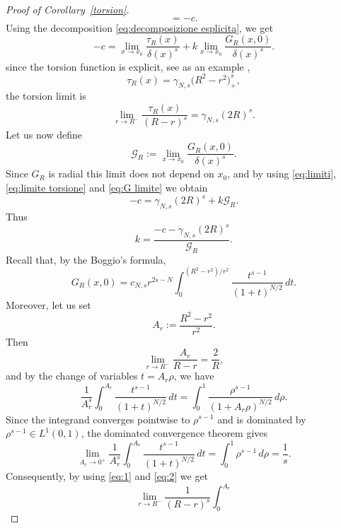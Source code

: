 \documentclass[11pt,a4paper]{article}
\newcommand{\dd}{\,d}
\begin{document}
\begin{proof}[Proof of Corollary~\ref{torsion}]
\[=
-c.
\]
Using the decomposition \eqref{eq:decomposizione esplicita}, we get
\begin{equation}\label{eq:limiti}
-c
=
\lim_{x\to x_0}
\frac{\tau_{R}(x)}{\delta(x)^s}
+
k
\lim_{x\to x_0}
\frac{G_{R}(x,0)}{\delta(x)^s}.
\end{equation}
since the torsion function is explicit, see as an example \cite{RosOtonSerra},
\begin{equation*}
\tau_{R}(x)
=
\gamma_{N,s}\bigl(R^2-r^2\bigr)_+^s,
\end{equation*}
the torsion limit is
\begin{equation}\label{eq:limite torsione}
\lim_{r\to R^-}
\frac{\tau_{R}(x)}{(R-r)^s}
=
\gamma_{N,s}(2R)^s.
\end{equation}
Let us now define
\begin{equation}\label{eq:G limite}
\mathcal G_{R}
:=
\lim_{x\to x_0}
\frac{G_{R}(x,0)}{\delta(x)^s}.
\end{equation}
Since $G_{R}$ is radial this limit does not depend on \(x_0\), and by using \eqref{eq:limiti}, \eqref{eq:limite torsione} and \eqref{eq:G limite} we obtain
\[
-c=\gamma_{N,s}(2R)^s+k\mathcal G_{R}.
\]
Thus
\begin{equation}\label{eq:k}
k=
\frac{-c-\gamma_{N,s}(2R)^s}{\mathcal G_{R}}.
\end{equation}
Recall that, by the Boggio's formula,
\begin{equation}\label{eq:Boggio's}
G_{R}(x,0)
=
c_{N,s}r^{2s-N}
\int_0^{(R^2-r^2)/r^2}
\frac{t^{s-1}}{(1+t)^{N/2}}\dd t.
\end{equation}
Moreover, let us set
\[
A_r:=\frac{R^2-r^2}{r^2}.
\]
Then
\begin{equation}\label{eq:1}
\lim_{r\to R^-}\frac{A_r}{R-r}=\frac2R,
\end{equation}
and by the change of variables \(t=A_{r}\rho\), we have
\[
\frac{1}{A_{r}^s}\int_0^{A_{r}}
\frac{t^{s-1}}{(1+t)^{N/2}}\,dt
=
\int_0^1
\frac{\rho^{s-1}}{(1+A_{r}\rho)^{N/2}}\,d\rho.
\]
Since the integrand converges pointwise to \(\rho^{s-1}\) and is dominated by
\(\rho^{s-1}\in L^1(0,1)\), the dominated convergence theorem gives
\begin{equation}\label{eq:2}
\lim_{A_{r}\to0^+}
\frac{1}{A^{s}_{r}}
\int_0^{A_{r}}
\frac{t^{s-1}}{(1+t)^{N/2}}\,dt
=
\int_0^1\rho^{s-1}\,d\rho
=
\frac1s.
\end{equation}
Consequently, by using \eqref{eq:1} and \eqref{eq:2} we get
\begin{equation}\label{eq:finale}
\lim_{r\to R^-}
\frac1{(R-r)^s}
\int_0^{A_r}

\end{equation}
\end{proof}
\end{document}
